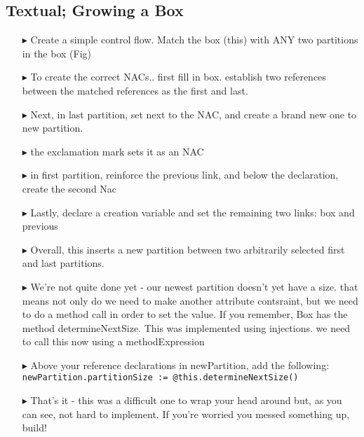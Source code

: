 \clearpage
\subsection{Textual; Growing a Box}
\texHeader
\hypertarget{growBox tex}{}

\begin{itemize}
  
\item[$\blacktriangleright$] Create a simple control flow. Match the box (this) with ANY two partitions in the box (Fig)

\item[$\blacktriangleright$] To create the correct NACs.. first fill in box. establish two references between the matched references as the first and last.

\item[$\blacktriangleright$] Next, in last partition, set next to the NAC, and create a brand new one to new partition.

\item[$\blacktriangleright$] the exclamation mark sets it as an NAC

\item[$\blacktriangleright$] in first partition, reinforce the previous link, and below the declaration, create the second Nac

\item[$\blacktriangleright$] Lastly, declare a creation variable and set the remaining two links: box and previous
  
\item[$\blacktriangleright$] Overall, this inserts a new partition between two arbitrarily selected first and last partitions.

\item[$\blacktriangleright$] We're not quite done yet - our newest partition doesn't yet have a size. that means not only do we need to make another attribute
contsraint, but we need to do a method call in order to set the value. %
If you remember, Box has the method determineNextSize. This was implemented using injections. we need to call this now using a methodExpression

\item[$\blacktriangleright$] Above your reference declarations in newPartition, add the following: \texttt{newPartition.partitionSize :=
@this.determineNextSize()}

\item[$\blacktriangleright$] That's it - this was a difficult one to wrap your head around but, as you can see, not hard to implement. If you're worried you
messed something up, build!

\end{itemize}